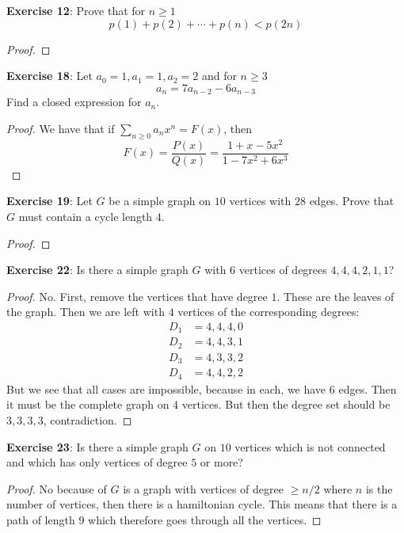 \documentclass{article}
\begin{document}
\textbf{Exercise 12}: Prove that for $n \geq 1$
    \begin{equation*}
        p(1) + p(2) + \cdots + p(n) < p(2n)
    \end{equation*}
    \begin{proof}
        
    \end{proof}

\textbf{Exercise 18}: Let $a_{0} = 1, a_{1} = 1, a_{2} = 2$ and for $n \geq 3$
    \begin{equation*}
        a_{n} = 7a_{n - 2} - 6a_{n - 3}
    \end{equation*}
Find a closed expression for $a_{n}$.
    \begin{proof}
        We have that if $\sum_{n \geq 0}a_{n}x^{n} = F(x)$, then 
            \begin{equation*}
                F(x) = \dfrac{P(x)}{Q(x)} = \dfrac{1 + x - 5x^{2}}{1 - 7x^{2} + 6x^{3}}
            \end{equation*}

    \end{proof}

\textbf{Exercise 19}: Let $G$ be a simple graph on $10$ vertices with $28$ edges. Prove that $G$ must contain a cycle length $4$.
    \begin{proof}
        
    \end{proof}

\textbf{Exercise 22}: Is there a simple graph $G$ with $6$ vertices of degrees $4, 4, 4, 2, 1, 1$?
    \begin{proof}
        No. First, remove the vertices that have degree $1$. These are the leaves of the graph. Then we are left with $4$ vertices of the corresponding degrees:
            \begin{align*}
                D_{1} &= 4, 4, 4, 0 \\
                D_{2} &= 4, 4, 3, 1 \\
                D_{3} &= 4, 3, 3, 2 \\
                D_{4} &= 4, 4, 2, 2   
            \end{align*}
        But we see that all cases are impossible, because in each, we have $6$ edges. Then it must be the complete graph on $4$ vertices. But then the degree set should be $3, 3, 3, 3$, contradiction.
    \end{proof}

\textbf{Exercise 23}: Is there a simple graph $G$ on $10$ vertices which is not connected and which has only vertices of degree $5$ or more?
    \begin{proof}
        No because of $G$ is a graph with vertices of degree $\geq n/2$ where $n$ is the number of vertices, then there is a hamiltonian cycle. This means that there is a path of length $9$ which therefore goes through all the vertices.
    \end{proof}
\end{document}
